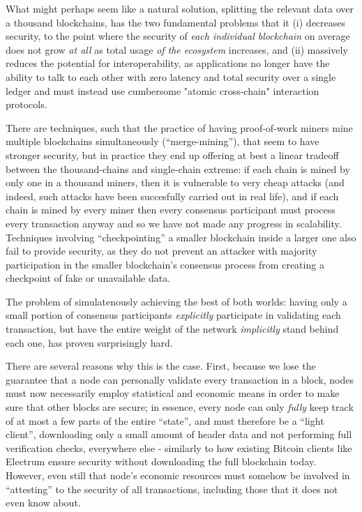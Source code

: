\documentclass[11pt,a4paper]{article}
\theoremstyle{plain}
\theoremstyle{definition}
\theoremstyle{remark}
\begin{document}
What might perhaps seem like a natural solution, splitting the relevant data over a thousand blockchains, has the two fundamental problems that it (i) decreases security, to the point where the security of \emph{each individual blockchain} on average does not grow \emph{at all} as total usage \emph{of the ecosystem} increases, and (ii) massively reduces the potential for interoperability, as applications no longer have the ability to talk to each other with zero latency and total security over a single ledger and must instead use cumbersome "atomic cross-chain" interaction protocols.\cite{tiernolan}

There are techniques, such that the practice of having proof-of-work miners mine multiple blockchains simultaneously (``merge-mining''), that seem to have stronger security, but in practice they end up offering at best a linear tradeoff between the thousand-chains and single-chain extreme: if each chain is mined by only one in a thousand miners, then it is vulnerable to very cheap attacks\cite{mmpetertodd} (and indeed, such attacks have been succesfully carried out in real life\cite{coiledcoin}), and if each chain is mined by every miner then every consensus participant must process every transaction anyway and so we have not made any progress in scalability. Techniques involving ``checkpointing'' a smaller blockchain inside a larger one also fail to provide security, as they do not prevent an attacker with majority participation in the smaller blockchain's consensus process from creating a checkpoint of fake or unavailable data.\cite{factompetertodd}

The problem of simulatenously achieving the best of both worlds: having only a small portion of consensus participants \emph{explicitly} participate in validating each transaction, but have the entire weight of the network \emph{implicitly} stand behind each one, has proven surprisingly hard.

There are several reasons why this is the case. First, because we lose the guarantee that a node can personally validate every transaction in a block, nodes must now necessarily employ statistical and economic means in order to make sure that other blocks are secure; in essence, every node can only \emph{fully} keep track of at most a few parts of the entire ``state'', and must therefore be a ``light client'', downloading only a small amount of header data and not performing full verification checks, everywhere else - similarly to how existing Bitcoin clients like Electrum\cite{electrum} ensure security without downloading the full blockchain today. However, even still that node's economic resources must somehow be involved in ``attesting'' to the security of all transactions, including those that it does not even know about.
\end{document}
